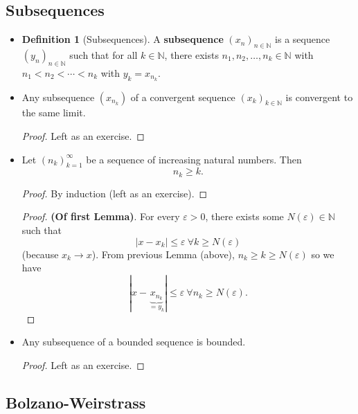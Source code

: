 \documentclass{article}
\newcommand{\N}{\mathbb{N}}
\newcommand{\seq}[2]{(#1_{#2})_{#2 \in \N}}
\newcommand{\?}{\stackrel{?}{=}}
\theoremstyle{definition} %
\newtheorem{definition}[subsection]{Definition} %
\begin{document}
\subsection{Subsequences}

\begin{itemize}
    \item[]
    \begin{definition}[Subsequences]
        A \textbf{subsequence} $\seq{x}{n}$ is a sequence $\seq{y}{n}$ such that for all $k \in \N$, there exists $n_1, n_2, \ldots, n_k \in \N$ with $n_1 < n_2 < \cdots < n_k$ with $y_k = x_{n_k}$.
    \end{definition}
    \item[]
    \begin{lemma}
        Any subsequence $(x_{n_k})$ of a convergent sequence $\seq{x}{k}$ is convergent to the same limit.
    \end{lemma}
    \begin{proof}
        Left as an exercise.
    \end{proof}
    \item[]
    \begin{lemma}
        Let $(n_k)_{k = 1}^{\infty}$ be a sequence of increasing natural numbers. Then
    $$n_k \geq k.$$
    \end{lemma}
    \begin{proof}
        By induction (left as an exercise).
    \end{proof}
    \begin{proof}
        \textbf{(Of first Lemma)}. For every $\varepsilon > 0$, there exists some $N(\varepsilon) \in \N$ such that
        $$|x - x_k| \leq \varepsilon \ \forall k \geq N(\varepsilon)$$
        (because $x_k \rightarrow x$). From previous Lemma (above), $n_k \geq k \geq N(\varepsilon)$ so we have
        $$|x - \underbrace{x_{n_k}}_{ = y_k}| \leq \varepsilon \ \forall n_k \geq N(\varepsilon).$$
    \end{proof}
    \item[]
    \begin{lemma}
        Any subsequence of a bounded sequence is bounded.
    \end{lemma}
    \begin{proof}
        Left as an exercise.
    \end{proof}
\end{itemize}

\subsection{Bolzano-Weirstrass}
\end{document}

